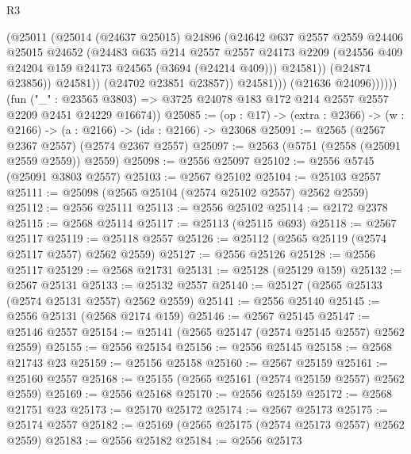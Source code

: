 \begin{lexlean}{R3}
\begin{coremodule}
                          (@25011
                            (@25014
                              (@24637 @25015)
                              @24896
                              (@24642
                                @637
                                @2557
                                @2559
                                @24406
                                @25015
                                @24652
                                (@24483
                                  @635
                                  @214
                                  @2557
                                  @2557
                                  @24173
                                  @2209
                                  (@24556 @409 @24204 @159 @24173 @24565 (@3694 (@24214 @409)))
                                  @24581))
                              (@24874 @23856))
                            @24581))
                        (@24702 @23851 @23857))
                      @24581)))
                (@21636 @24096))))))
      (fun ("_" : @23565 @3803) =>
      @3725 @24078 @183 @172 @214 @2557 @2557 @2209 @2451 @24229 @16674))
@25085 := (op : @17) -> (extra : @2366) -> (w : @2166) -> (a : @2166) -> (ids : @2166) -> @23068
@25091 := @2565 (@2567 @2367 @2557) (@2574 @2367 @2557)
@25097 := @2563 (@5751 (@2558 (@25091 @2559 @2559)) @2559)
@25098 := @2556 @25097
@25102 := @2556 @5745 (@25091 @3803 @2557)
@25103 := @2567 @25102
@25104 := @25103 @2557
@25111 := @25098 (@2565 @25104 (@2574 @25102 @2557) @2562 @2559)
@25112 := @2556 @25111
@25113 := @2556 @25102
@25114 := @2172 @2378
@25115 := @2568 @25114
@25117 := @25113 (@25115 @693)
@25118 := @2567 @25117
@25119 := @25118 @2557
@25126 := @25112 (@2565 @25119 (@2574 @25117 @2557) @2562 @2559)
@25127 := @2556 @25126
@25128 := @2556 @25117
@25129 := @2568 @21731
@25131 := @25128 (@25129 @159)
@25132 := @2567 @25131
@25133 := @25132 @2557
@25140 := @25127 (@2565 @25133 (@2574 @25131 @2557) @2562 @2559)
@25141 := @2556 @25140
@25145 := @2556 @25131 (@2568 @2174 @159)
@25146 := @2567 @25145
@25147 := @25146 @2557
@25154 := @25141 (@2565 @25147 (@2574 @25145 @2557) @2562 @2559)
@25155 := @2556 @25154
@25156 := @2556 @25145
@25158 := @2568 @21743 @23
@25159 := @25156 @25158
@25160 := @2567 @25159
@25161 := @25160 @2557
@25168 := @25155 (@2565 @25161 (@2574 @25159 @2557) @2562 @2559)
@25169 := @2556 @25168
@25170 := @2556 @25159
@25172 := @2568 @21751 @23
@25173 := @25170 @25172
@25174 := @2567 @25173
@25175 := @25174 @2557
@25182 := @25169 (@2565 @25175 (@2574 @25173 @2557) @2562 @2559)
@25183 := @2556 @25182
@25184 := @2556 @25173

\end{coremodule}
\end{lexlean}
